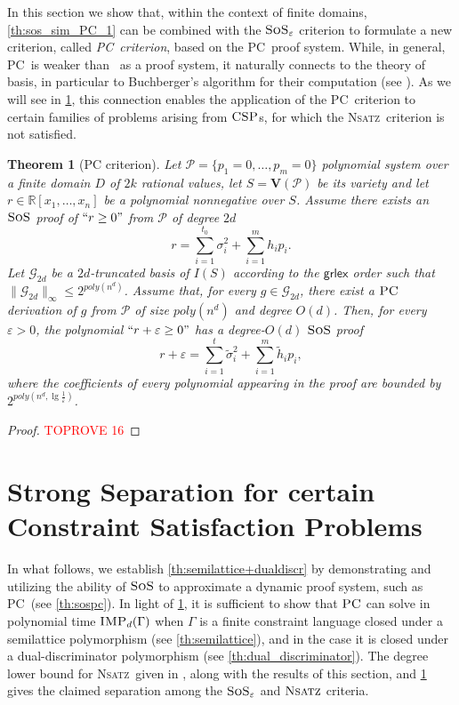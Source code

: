 \documentclass[11pt]{article}
\newcommand{\sos}{\text{\sc{SoS}}}
\newcommand{\CSP}{\textsc{CSP}}
\newcommand{\IMP}{\textsc{IMP}}
\newcommand{\PC}{\textsc{PC}}
\newcommand{\Nsatz}{\textsc{Nsatz}}
\newcommand{\grlexns}{\textsf{grlex}}
\newcommand{\Variety}[1]{{\textbf{V}}\left( #1 \right)}
\newcommand{\1}{\textbf{1}}
\newcommand{\GB}{\text{Gr\"{o}bner} }
\newtheorem{theorem}{Theorem}[section]
\begin{document}
In this section we show that, within the context of finite domains, \cref{th:sos_sim_PC_1} can be combined with the $\sos_{\varepsilon}$ criterion to formulate a new criterion, called \emph{\PC\ criterion}, based on the \PC\ proof system. 
While, in general, \PC\ is weaker than \sos\ as a proof system, it naturally connects to the theory of \GB basis, in particular to Buchberger's algorithm for their computation (see \cite{BuchbergerThesis}).
As we will see in \cref{sect:applications}, this connection enables the application of the \PC\ criterion to certain families of problems arising from $\CSP$s, for which the \Nsatz\ criterion is not satisfied.

\begin{theorem}[PC criterion]\label{th:PC_criterion}
    Let $\mathcal{P} = \{p_1 = 0, \dots, p_m = 0\}$ polynomial system over a finite domain $D$ of $2k$ rational values, let $S=\Variety{\mathcal{P}}$ be its variety and let $r\in\mathbb{R}[x_1, \dots, x_n]$ be a polynomial nonnegative over $S$. Assume there exists an $\sos$ proof of $``r\geq 0"$ from $\mathcal{P}$ of degree $2d$
  \begin{equation*}
        r = \sum_{i=1}^{t_0} \sigma_i^2 + \sum_{i=1}^m h_i p_i.
    \end{equation*}
   Let $\mathcal{G}_{2d}$ be a $2d$-truncated \GB basis of $I(S)$ according to the $\grlexns$ order such that $\|\mathcal{G}_{2d}\|_{\infty}\leq 2^{poly(n^d)}$. Assume that, for every $g\in \mathcal{G}_{2d}$, there exist a $\PC$ derivation of $g$ from $\mathcal{P}$ of size $poly(n^d)$ and degree $O(d)$. Then, for every $\varepsilon>0$, the polynomial $``r+\varepsilon \geq 0"$ has a degree-$O(d)$ $\sos$ proof
    \begin{equation*}
        r +\varepsilon = \sum_{i=1}^{t} \tilde{\sigma}_i^2 + \sum_{i=1}^m \tilde{h}_i p_i,
    \end{equation*}
    where the coefficients of every polynomial appearing in the proof are bounded by $2^{poly(n^d, \lg \frac{1}{\varepsilon})}$.   
\end{theorem}
\begin{proof}\textcolor{red}{TOPROVE 16}\end{proof}

\section{Strong Separation for certain Constraint Satisfaction Problems}\label{sect:applications}
In what follows, we establish \cref{th:semilattice+dualdiscr} by demonstrating and utilizing the ability of \(\sos\) to approximate a dynamic proof system, such as \PC\ (see \cref{th:sospc}).
 In light of \cref{th:PC_criterion}, it is sufficient to show that $\PC$ can solve in polynomial time $\IMP_d(\Gamma)$ when $\Gamma$ is a finite constraint language closed under a semilattice polymorphism (see \cref{th:semilattice}), and in the case it is closed under a dual-discriminator polymorphism (see \cref{th:dual_discriminator}). 
The degree lower bound for \Nsatz\ given in \cite{BussP98}, along with the results of this section, and \cref{th:PC_criterion} gives the claimed separation among the $\sos_{\varepsilon}$ and $\Nsatz$ criteria. 
\end{document}
